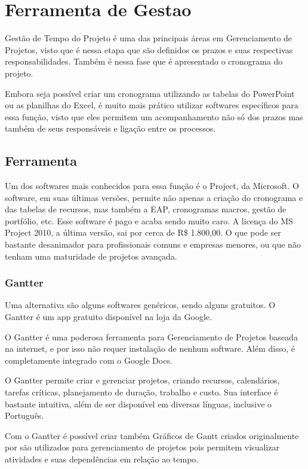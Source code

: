 \chapter[Ferramenta de Gestao]{Ferramenta de Gestao}

Gestão de Tempo do Projeto é uma das principais áreas em Gerenciamento de Projetos, visto que é nessa etapa que são definidos os prazos e suas respectivas responsabilidades. Também é nessa fase que é apresentado o cronograma do projeto.

Embora seja possível criar um cronograma utilizando as tabelas do PowerPoint ou as planilhas do Excel, é muito mais prático utilizar softwares específicos para essa função, visto que eles permitem um acompanhamento não só dos prazos mas também de seus responsáveis e ligação entre os processos.

\section{Ferramenta}

Um dos softwares mais conhecidos para essa função é o Project, da Microsoft. O software, em suas últimas versões, permite não apenas a criação do cronograma e das tabelas de recursos, mas também a EAP, cronogramas macros, gestão de portfólio, etc. Esse software é pago e acaba sendo muito caro. A licença do MS Project 2010, a última versão, sai por cerca de R\$ 1.800,00. O que pode ser bastante desanimador para profissionais comuns e empresas menores, ou que não tenham uma maturidade de projetos avançada.

\subsection{Gantter}

Uma alternativa são alguns softwares genéricos, sendo alguns gratuitos. O Gantter é um app gratuito disponível na loja da Google.

O Gantter é uma poderosa ferramenta para Gerenciamento de Projetos baseada na internet, e por isso não requer instalação de nenhum software. Além disso, é completamente integrado com o Google Docs.

O Gantter permite criar e gerenciar projetos, criando recursos, calendários, tarefas críticas, planejamento de duração, trabalho e custo. Sua interface é bastante intuitiva, além de ser disponível em diversas línguas, inclusive o Português.

Com o Gantter é possível criar também Gráficos de Gantt criados originalmente por \cite{HLGANTT} são utilizados para gerenciamento de projetos pois permitem visualizar atividades e suas dependências em relação ao tempo.


